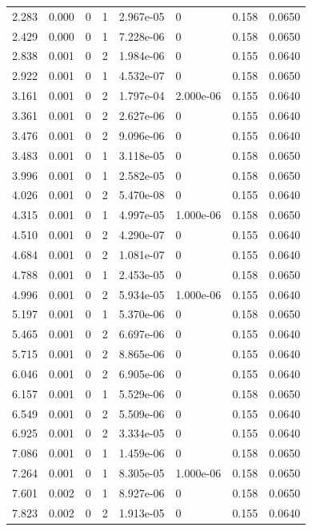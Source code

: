 \documentclass[preview]{standalone}
\begin{document}
{{\begin{tabular}{L{1.2cm}C{1.2cm} C{0.3cm}C{0.5cm} C{1.4cm}C{1.4cm} C{1.4cm}C{1.4cm}}
  2.283  &  0.000  & 0     &  1 &  2.967e-05  & 0  & 0.158 &  0.0650   \\ 
  2.429  &  0.000  & 0     &  1 &  7.228e-06  & 0  & 0.158 &  0.0650   \\ 
  2.838  &  0.001  & 0     &  2 &  1.984e-06  & 0  & 0.155 &  0.0640   \\ 
  2.922  &  0.001  & 0     &  1 &  4.532e-07  & 0  & 0.158 &  0.0650   \\ 
  3.161  &  0.001  & 0     &  2 &  1.797e-04  & 2.000e-06  & 0.155 &  0.0640   \\ 
  3.361  &  0.001  & 0     &  2 &  2.627e-06  & 0  & 0.155 &  0.0640   \\ 
  3.476  &  0.001  & 0     &  2 &  9.096e-06  & 0  & 0.155 &  0.0640   \\ 
  3.483  &  0.001  & 0     &  1 &  3.118e-05  & 0  & 0.158 &  0.0650   \\ 
  3.996  &  0.001  & 0     &  1 &  2.582e-05  & 0  & 0.158 &  0.0650   \\ 
  4.026  &  0.001  & 0     &  2 &  5.470e-08  & 0  & 0.155 &  0.0640   \\ 
  4.315  &  0.001  & 0     &  1 &  4.997e-05  & 1.000e-06  & 0.158 &  0.0650   \\ 
  4.510  &  0.001  & 0     &  2 &  4.290e-07  & 0  & 0.155 &  0.0640   \\ 
  4.684  &  0.001  & 0     &  2 &  1.081e-07  & 0  & 0.155 &  0.0640   \\ 
  4.788  &  0.001  & 0     &  1 &  2.453e-05  & 0  & 0.158 &  0.0650   \\ 
  4.996  &  0.001  & 0     &  2 &  5.934e-05  & 1.000e-06  & 0.155 &  0.0640   \\ 
  5.197  &  0.001  & 0     &  1 &  5.370e-06  & 0  & 0.158 &  0.0650   \\ 
  5.465  &  0.001  & 0     &  2 &  6.697e-06  & 0  & 0.155 &  0.0640   \\ 
  5.715  &  0.001  & 0     &  2 &  8.865e-06  & 0  & 0.155 &  0.0640   \\ 
  6.046  &  0.001  & 0     &  2 &  6.905e-06  & 0  & 0.155 &  0.0640   \\ 
  6.157  &  0.001  & 0     &  1 &  5.529e-06  & 0  & 0.158 &  0.0650   \\ 
  6.549  &  0.001  & 0     &  2 &  5.509e-06  & 0  & 0.155 &  0.0640   \\ 
  6.925  &  0.001  & 0     &  2 &  3.334e-05  & 0  & 0.155 &  0.0640   \\ 
  7.086  &  0.001  & 0     &  1 &  1.459e-06  & 0  & 0.158 &  0.0650   \\ 
  7.264  &  0.001  & 0     &  1 &  8.305e-05  & 1.000e-06  & 0.158 &  0.0650   \\ 
  7.601  &  0.002  & 0     &  1 &  8.927e-06  & 0  & 0.158 &  0.0650   \\ 
  7.823  &  0.002  & 0     &  2 &  1.913e-05  & 0  & 0.155 &  0.0640   \\ 
\hline 
\end{tabular} 

}}
\end{document}
